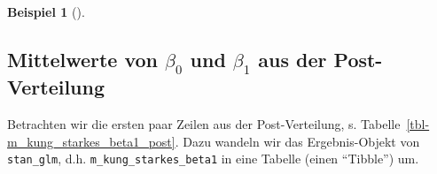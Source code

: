 \documentclass[
  ngerman,
  letterpaper,
  twoside,
  open=any]{scrbook}
\newenvironment{Shaded}{\begin{snugshade}}{\end{snugshade}}
\newcommand{\FunctionTok}[1]{\textcolor[rgb]{0.28,0.35,0.67}{#1}}
\newcommand{\NormalTok}[1]{\textcolor[rgb]{0.00,0.23,0.31}{#1}}
\newcommand{\OtherTok}[1]{\textcolor[rgb]{0.00,0.23,0.31}{#1}}
\newcommand{\SpecialCharTok}[1]{\textcolor[rgb]{0.37,0.37,0.37}{#1}}
\theoremstyle{definition}
\newtheorem{example}{Beispiel}[chapter]
\theoremstyle{plain}
\theoremstyle{definition}
\theoremstyle{definition}
\theoremstyle{remark}
\begin{document}
\begin{example}[]
\begin{tcolorbox}
\end{tcolorbox}


\subsection{\texorpdfstring{Mittelwerte von \(\beta_0\) und \(\beta_1\)
aus der
Post-Verteilung}{Mittelwerte von \textbackslash beta\_0 und \textbackslash beta\_1 aus der Post-Verteilung}}\label{mittelwerte-von-beta_0-und-beta_1-aus-der-post-verteilung}

Betrachten wir die ersten paar Zeilen aus der Post-Verteilung, s.
Tabelle~\ref{tbl-m_kung_starkes_beta1_post}. Dazu wandeln wir das
Ergebnis-Objekt von \texttt{stan\_glm}, d.h.
\texttt{m\_kung\_starkes\_beta1} in eine Tabelle (einen
\enquote{Tibble}) um.

\begin{codelisting}

\caption{\label{lst-m_kung_starkes_beta1_post}Die Post-Verteilung
bekommen wir, indem wir das Ergebnisobjekt von \texttt{stan\_glm} in
einen Tibble (Dataframe) umwandeln.}

\centering{

\begin{Shaded}
\begin{Highlighting}[]
\NormalTok{m\_kung\_starkes\_beta1\_post }\OtherTok{\textless{}{-}} 
\NormalTok{m\_kung\_starkes\_beta1 }\SpecialCharTok{|\textgreater{}} 
  \FunctionTok{as\_tibble}\NormalTok{() }\SpecialCharTok{|\textgreater{}} 
  \FunctionTok{head}\NormalTok{()}
\end{Highlighting}
\end{Shaded}

}

\end{codelisting}%

\begin{table}

\caption{\label{tbl-m_kung_starkes_beta1_post}Die ersten paar Zeilen der
Post-Verteilung von \texttt{m\_kung\_starkes\_beta1}}

\end{table}
\end{example}
\end{document}
